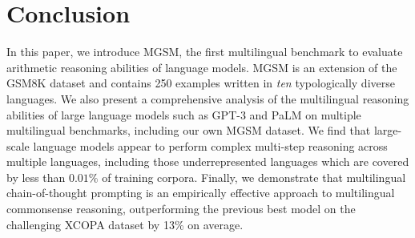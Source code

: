 \section{Conclusion}
In this paper, we introduce {MGSM}, the first multilingual benchmark to evaluate arithmetic reasoning abilities of language models. MGSM is an extension of the GSM8K dataset \citep{cobbe2021training} and contains 250 examples written in \emph{ten} typologically diverse languages. We also present a comprehensive analysis of the multilingual reasoning abilities of large language models such as GPT-3 and PaLM on multiple multilingual benchmarks, including our own MGSM dataset. We find that large-scale language models appear to perform complex multi-step reasoning across multiple languages, including those underrepresented languages which are covered by less than $0.01\%$ of training corpora. Finally, we demonstrate that multilingual chain-of-thought prompting is an empirically effective approach to multilingual commonsense reasoning, outperforming the previous best model on the challenging XCOPA dataset by 13\% on average.


